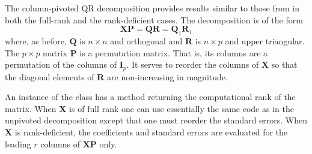 \documentclass[shortnames,article]{jss}
\begin{document}
The column-pivoted QR decomposition provides results similar to those
from  in both the full-rank and the rank-deficient cases.
The decomposition is of the form
\begin{displaymath}
  \bm X\bm P=\bm Q\bm R=\bm Q_1\bm R_1
\end{displaymath}
where, as before, $\bm Q$ is $n\times n$ and orthogonal and $\bm R$ is
$n\times p$ and upper triangular.  The $p\times p$ matrix $\bm P$ is a
permutation matrix.  That is, its columns are a permutation of the
columns of $\bm I_p$.  It serves to reorder the columns of $\bm X$ so
that the diagonal elements of $\bm R$ are non-increasing in magnitude.

An instance of the class  has a
 method returning the computational rank of the matrix.
When $\bm X$ is of full rank one can use essentially the same code as
in the unpivoted decomposition except that one must reorder the
standard errors.  When $\bm X$ is rank-deficient, the
coefficients and standard errors are evaluated for the leading $r$ columns of $\bm
X\bm P$ only.
\end{document}
